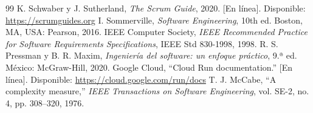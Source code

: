\documentclass[conference]{IEEEtran}
\begin{document}
\begin{thebibliography}{99}
 K. Schwaber y J. Sutherland, \emph{The Scrum Guide}, 2020. [En línea]. Disponible: \url{https://scrumguides.org}
 I. Sommerville, \emph{Software Engineering}, 10th ed. Boston, MA, USA: Pearson, 2016.
 IEEE Computer Society, \emph{IEEE Recommended Practice for Software Requirements Specifications}, IEEE Std 830-1998, 1998.
 R. S. Pressman y B. R. Maxim, \emph{Ingeniería del software: un enfoque práctico}, 9.ª ed. México: McGraw-Hill, 2020.
 Google Cloud, ``Cloud Run documentation.'' [En línea]. Disponible: \url{https://cloud.google.com/run/docs}
 T. J. McCabe, ``A complexity measure,'' \emph{IEEE Transactions on Software Engineering}, vol. SE-2, no. 4, pp. 308--320, 1976.
\end{thebibliography}
\end{document}

